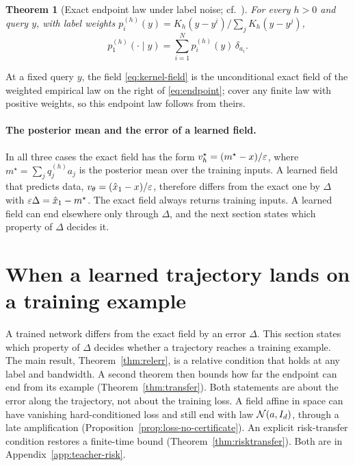 \documentclass{article} %
\theoremstyle{plain}
\newtheorem{theorem}{Theorem}[section]
\theoremstyle{definition}
\theoremstyle{remark}
\begin{document}
\begin{theorem}[{Exact endpoint law under label noise; cf.\ \citealp{wan2025elucidating}}]
\label{thm:endpoint}
For every $h>0$ and query $y$, with label weights $p_i^{(h)}(y)=K_h(y-y^i)/\sum_jK_h(y-y^j)$,
\begin{equation}
p_1^{(h)}(\cdot\mid y)=\sum_{i=1}^N p_i^{(h)}(y)\,\delta_{a_i}.
\label{eq:endpoint}
\end{equation}
\end{theorem}
At a fixed query $y$, the field \eqref{eq:kernel-field} is the unconditional exact field of the
weighted empirical law on the right of \eqref{eq:endpoint}; \citet[Theorem~5.3]{wan2025elucidating} cover any finite law with positive weights, so this
endpoint law follows from theirs.

\paragraph{The posterior mean and the error of a learned field.} In all three cases the exact field
has the form $v_h^\star=(m^\star-x)/\varepsilon$, where $m^\star=\sum_jq_j^{(h)}a_j$ is the posterior mean
over the training inputs. A learned field that predicts data, $v_\theta=(\hat x_1-x)/\varepsilon$,
therefore differs from the exact one by $\Delta$ with $\varepsilon\Delta=\hat x_1-m^\star$. The exact
field always returns training inputs. A learned field can end elsewhere only through $\Delta$, and
the next section states which property of $\Delta$ decides it.

\section{When a learned trajectory lands on a training example}
\label{sec:transfer}

A trained network differs from the exact field by an error $\Delta$. This section states which
property of $\Delta$ decides whether a trajectory reaches a training example. The main result,
Theorem~\ref{thm:relerr}, is a relative condition that holds at any label and bandwidth. A
second theorem then bounds how far the endpoint can end from its example (Theorem~\ref{thm:transfer}).
Both statements are about the error along the trajectory, not about the training loss. A field
affine in space can have vanishing hard-conditioned loss and still end with law $\mathcal{N}(a,I_d)$, through
a late amplification (Proposition~\ref{prop:loss-no-certificate}). An explicit risk-transfer
condition restores a finite-time bound (Theorem~\ref{thm:risktransfer}). Both are in
Appendix~\ref{app:teacher-risk}.
\end{document}
